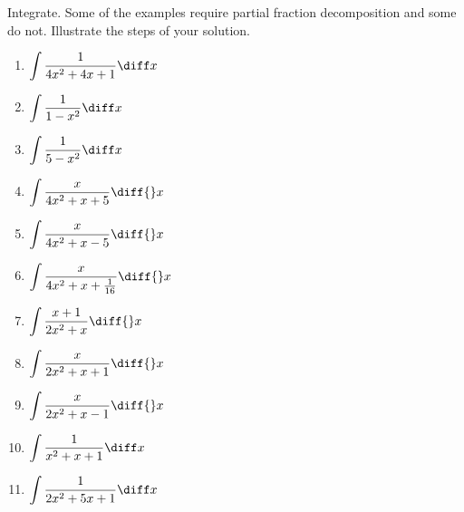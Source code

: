 Integrate. Some of the examples require partial fraction decomposition and some do not. Illustrate the steps of your solution. 
\begin{multicols}{2}
\begin{enumerate}[ref={\fcProblemRef}]
\item $\displaystyle\int \frac{1}{4x^2+4x+1}\diff x$

\item $\displaystyle \int \frac{1}{1-x^2}\diff x$


\item $\displaystyle \int \frac{1}{5-x^2}\diff x$


\item $\displaystyle \int \frac{x}{4x^2+x+5}\diff {}x$

\item $\displaystyle \int \frac{x}{4x^2+x-5}\diff {}x$
\item $\displaystyle \int \frac{x}{4x^2 +x+ \frac{ 1}{16}}\diff {}x$

\item $\displaystyle \int \frac{x+1}{2x^2+x}\diff {}x$

\item $\displaystyle \int \frac{x}{2x^2+x+1}\diff {}x$

\item \label{problemIntegrate x/(2x^2+x-1)dx}
$\displaystyle\int \frac{x }{2x^2+x-1}\diff{}x
$


\item $\displaystyle\int \frac{1}{x^2+x+1}\diff x$

\item $\displaystyle\int \frac{1}{2x^2+5x+1}\diff x$

\end{enumerate}
\end{multicols}
